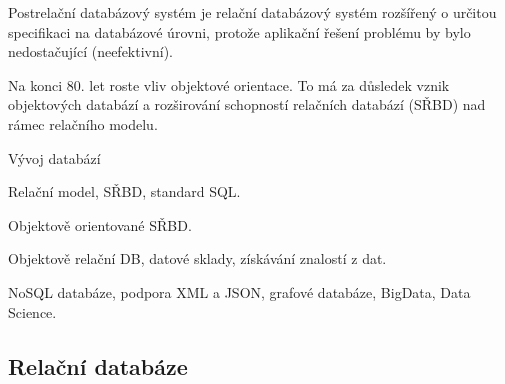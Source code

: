 \begin{compactitem}
    \item Postrelační databázový systém je relační databázový systém rozšířený o určitou specifikaci na databázové úrovni, protože aplikační řešení problému by bylo nedostačující (neefektivní). \begin{compactitem}
        \item Na konci 80. let roste vliv objektové orientace. To má za důsledek vznik objektových databází a rozširování schopností relačních databází (SŘBD) nad rámec relačního modelu.
    \end{compactitem}
    \item Vývoj databází \begin{compactitem}
        \item Relační model, SŘBD, standard SQL.
        \item Objektově orientované SŘBD.
        \item Objektově relační DB, datové sklady, získávání znalostí z dat.
        \item NoSQL databáze, podpora XML a JSON, grafové databáze, BigData, Data Science.
    \end{compactitem}
\end{compactitem}

\subsection{Relační databáze}

